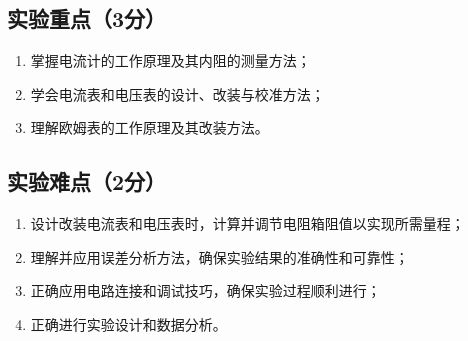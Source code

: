 \documentclass[]{../template/Report}%
\begin{document}
\subsection{实验重点（3分）}
\begin{enumerate}
    \item 掌握电流计的工作原理及其内阻的测量方法；
    \item 学会电流表和电压表的设计、改装与校准方法；
    \item 理解欧姆表的工作原理及其改装方法。
\end{enumerate}

\subsection{实验难点（2分）}
\begin{enumerate}
    \item 设计改装电流表和电压表时，计算并调节电阻箱阻值以实现所需量程；
    \item 理解并应用误差分析方法，确保实验结果的准确性和可靠性；
    \item 正确应用电路连接和调试技巧，确保实验过程顺利进行；
    \item 正确进行实验设计和数据分析。
\end{enumerate}
\end{document}
